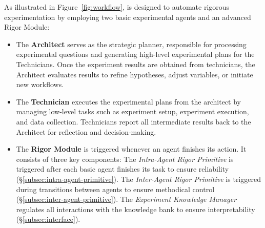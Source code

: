 As illustrated in Figure~\ref{fig:workflow}, \sys is designed to automate rigorous experimentation by employing two basic experimental agents and an advanced Rigor Module:

\begin{itemize}
    \item The \textbf{Architect} serves as the strategic planner, responsible for processing experimental questions and generating high-level experimental plans for the Technicians.
    Once the experiment results are obtained from technicians, the Architect evaluates results to refine hypotheses, adjust variables, or initiate new workflows. %
    
    \item The \textbf{Technician} executes the experimental plans from the architect by managing low-level tasks such as experiment setup, experiment execution, and data collection. 
    Technicians report all intermediate results back to the Architect for reflection and decision-making.

    \item The \textbf{Rigor Module} is triggered whenever an agent finishes its action. It consists of three key components:
     The \textit{Intra-Agent Rigor Primitive} is triggered after each basic agent finishes its task to ensure reliability (\S\ref{subsec:intra-agent-primitive}).
     The \textit{Inter-Agent Rigor Primitive} is triggered during transitions between agents to ensure methodical control (\S\ref{subsec:inter-agent-primitive}). 
    The \textit{Experiment Knowledge Manager} regulates all interactions with the knowledge bank to ensure interpretability (\S\ref{subsec:interface}).


\end{itemize}
